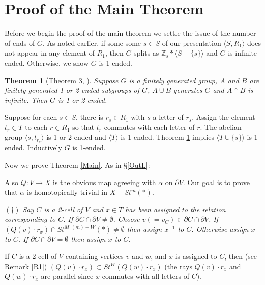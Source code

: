 \documentclass[12pt]{article}
\newtheorem{theorem}{Theorem}[section]
\numberwithin{equation}{section}
\begin{document}
\section{Proof of the Main Theorem}\label{PMT}
Before we begin the proof of the main theorem we settle the issue of the number of ends of $G$. As noted earlier, if some some $s\in S$ of our presentation $\langle S,R_1\rangle$ does not appear in any element of $R_1$, then $G$ splits as $\mathbb Z_s\ast \langle S-\{s\}\rangle$ and $G$ is infinite ended. Otherwise, we show $G$ is 1-ended.
\begin{theorem} [Theorem 3, \cite{M4}] \label{combE}  
Suppose $G$ is a finitely generated group, $A$ and $B$ are finitely generated 1 or 2-ended subgroups of $G$, $A\cup B$ generates $G$ and $A\cap B$ is infinite. Then $G$ is 1 or 2-ended.
\end{theorem}
Suppose for each $s\in S$, there is $r_s\in R_1$ with $s$ a letter of $r_s$. Assign the element $t_r\in T$ to each  $r\in R_1$ so that $t_r$ commutes with each letter of $r$.
The abelian group $\langle s,t_{r_s}\rangle$ is 1 or 2-ended and $\langle T\rangle$ is 1-ended. Theorem \ref{combE} implies $\langle T\cup \{s\}\rangle$ is 1-ended. 
Inductively $G$ is 1-ended. 

Now we prove Theorem \ref{Main}. As in \S\ref{OutL}:

\medskip 


\medskip

Also $Q:V\to X$ is the obvious map agreeing with $\alpha$ on $\partial V$.  Our goal is to prove that $\alpha$ is homotopically trivial in $X-St^m(\ast)$.

\medskip

\noindent $(\dagger)$ {\it Say $C$ is a 2-cell of $V$ and $x\in T$ has been assigned to the relation corresponding to $C$.
If $\partial C\cap \partial V\ne\emptyset$.  Choose $v(=v_C)\in \partial C\cap \partial V$.
If $(Q(v)\cdot r_x)\cap St^{M_1(m)+W}(\ast)\ne\emptyset$ then assign $x^{-1}$ to $C$.  Otherwise assign $x$ to $C$.
If $\partial C\cap \partial V=\emptyset$ then assign $x$ to $C$.} 

\medskip



If $C$ is a 2-cell of $V$ containing vertices $v$ and $w$, and $x$ is assigned to $C$, then (see Remark \ref{R1}) $(Q(v)\cdot r_{x})\subset St^W(Q(w)\cdot r_{x})$ (the rays $Q(v)\cdot r_{x}$ and $Q(w)\cdot r_{x}$ are parallel since $x$ commutes with all letters of $C$). 
\end{document}
